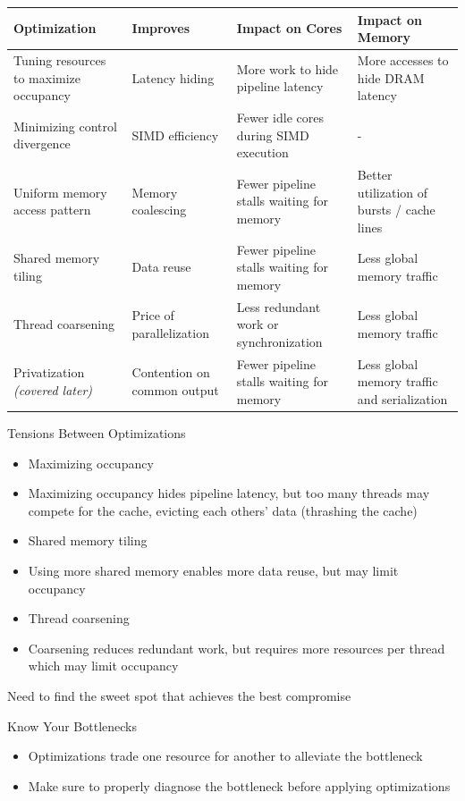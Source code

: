 \documentclass{article}
\begin{document}
\begin{longtable}{l|l|l|l}
\hline
Optimization & Improves & Impact on Cores & Impact on Memory \\ \hline
Tuning resources to maximize occupancy & Latency hiding & More work to hide pipeline latency & More accesses to hide DRAM latency \\ \hline
Minimizing control divergence & SIMD efficiency & Fewer idle cores during SIMD execution & - \\ \hline
Uniform memory access pattern & Memory coalescing & Fewer pipeline stalls waiting for memory & Better utilization of bursts / cache lines \\ \hline
Shared memory tiling & Data reuse & Fewer pipeline stalls waiting for memory & Less global memory traffic \\ \hline
Thread coarsening & Price of parallelization & Less redundant work or synchronization & Less global memory traffic \\ \hline
Privatization \textit{(covered later)} & Contention on common output & Fewer pipeline stalls waiting for memory & Less global memory traffic and serialization \\ \hline
\end{longtable}

Tensions Between Optimizations

\begin{itemize}
\item Maximizing occupancy
\item Maximizing occupancy hides pipeline latency, but too many threads may compete for the cache, evicting each others' data (thrashing the cache)
\item Shared memory tiling
\item Using more shared memory enables more data reuse, but may limit occupancy
\item Thread coarsening
\item Coarsening reduces redundant work, but requires more resources per thread which may limit occupancy

\end{itemize}
Need to find the sweet spot that achieves the best compromise


Know Your Bottlenecks

\begin{itemize}
\item Optimizations trade one resource for another to alleviate the bottleneck
\item Make sure to properly diagnose the bottleneck before applying optimizations
\end{itemize}
\end{document}
